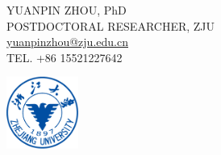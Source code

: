 \documentclass{article}
\begin{document}
\begin{figure}[bp]
	\begin{minipage}{0.49\linewidth}
		\begin{FlushLeft}
			{\footnotesize YUANPIN ZHOU, PhD}\\
			{\footnotesize POSTDOCTORAL RESEARCHER, ZJU}\\
			\underline{{\small \href{mailto:yuanpinzhou@zju.edu.cn}{yuanpinzhou@zju.edu.cn}}}\\
			{\small TEL. +86 15521227642}
		\end{FlushLeft}
	\end{minipage}
	\hfill
	\begin{minipage}{0.49\linewidth}
		\hfill
		\includegraphics[width=0.21\textwidth]{zju_1.pdf}
	\end{minipage}
\end{figure}
\end{document}
